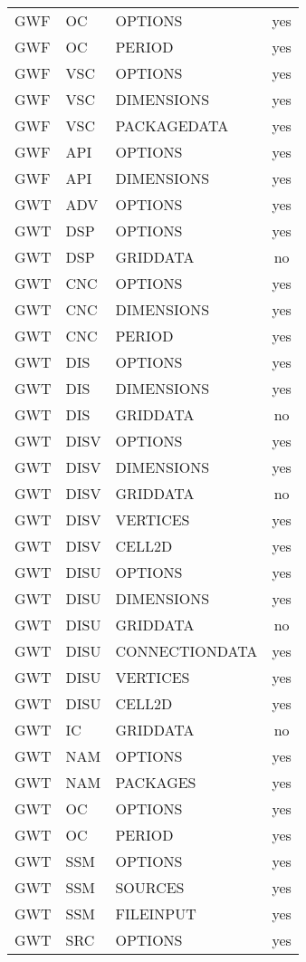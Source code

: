 \begin{longtable}{p{1.5cm} p{1.5cm} p{3cm} c}
\hline
GWF & OC & OPTIONS & yes \\ 
GWF & OC & PERIOD & yes \\ 
\hline
GWF & VSC & OPTIONS & yes \\ 
GWF & VSC & DIMENSIONS & yes \\ 
GWF & VSC & PACKAGEDATA & yes \\ 
\hline
GWF & API & OPTIONS & yes \\ 
GWF & API & DIMENSIONS & yes \\ 
\hline
GWT & ADV & OPTIONS & yes \\ 
\hline
GWT & DSP & OPTIONS & yes \\ 
GWT & DSP & GRIDDATA & no \\ 
\hline
GWT & CNC & OPTIONS & yes \\ 
GWT & CNC & DIMENSIONS & yes \\ 
GWT & CNC & PERIOD & yes \\ 
\hline
GWT & DIS & OPTIONS & yes \\ 
GWT & DIS & DIMENSIONS & yes \\ 
GWT & DIS & GRIDDATA & no \\ 
\hline
GWT & DISV & OPTIONS & yes \\ 
GWT & DISV & DIMENSIONS & yes \\ 
GWT & DISV & GRIDDATA & no \\ 
GWT & DISV & VERTICES & yes \\ 
GWT & DISV & CELL2D & yes \\ 
\hline
GWT & DISU & OPTIONS & yes \\ 
GWT & DISU & DIMENSIONS & yes \\ 
GWT & DISU & GRIDDATA & no \\ 
GWT & DISU & CONNECTIONDATA & yes \\ 
GWT & DISU & VERTICES & yes \\ 
GWT & DISU & CELL2D & yes \\ 
\hline
GWT & IC & GRIDDATA & no \\ 
\hline
GWT & NAM & OPTIONS & yes \\ 
GWT & NAM & PACKAGES & yes \\ 
\hline
GWT & OC & OPTIONS & yes \\ 
GWT & OC & PERIOD & yes \\ 
\hline
GWT & SSM & OPTIONS & yes \\ 
GWT & SSM & SOURCES & yes \\ 
GWT & SSM & FILEINPUT & yes \\ 
\hline
GWT & SRC & OPTIONS & yes \\ 

\end{longtable}
